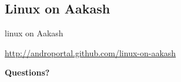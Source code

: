 \documentclass{beamer}
\begin{document}
  \subsection{Linux on Aakash}
  \begin{frame}{linux on Aakash}
    \begin{block}{}
      \centerline
          {\url{http://androportal.github.com/linux-on-aakash}}
    \end{block}
  \end{frame}

  \begin{frame}{}
      \centerline{\bf Questions?}
  \end{frame}
  



\end{document}
